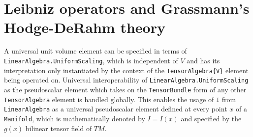 \documentclass{juliacon}
\begin{document}

\newpage

\section{Leibniz operators and Grassmann's Hodge-DeRahm theory}

A universal unit volume element can be specified in terms of \verb`LinearAlgebra.UniformScaling`, which is independent of $V$ and has its interpretation only instantiated by the context of the \verb`TensorAlgebra{V}` element being operated on.
Universal interoperability of \verb`LinearAlgebra.UniformScaling` as the pseudoscalar element which takes on the \verb`TensorBundle` form of any other \verb`TensorAlgebra` element is handled globally.
This enables the usage of \verb`I` from \verb`LinearAlgebra` as a universal pseudoscalar element defined at every point $x$ of a \verb`Manifold`, which is mathematically denoted by $I=I(x)$ and specified by the $g(x)$ bilinear tensor field of $TM$.
\end{document}
